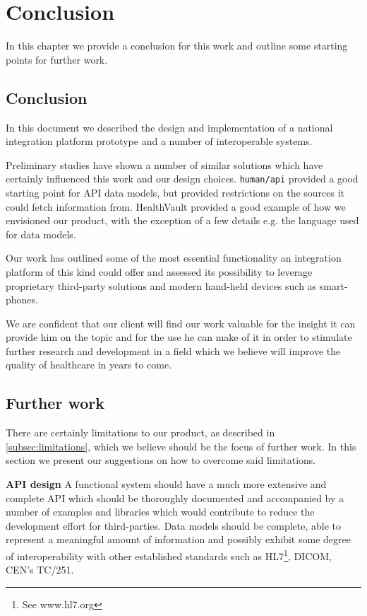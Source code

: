 \chapter{Conclusion}
\label{ch:conclusion}

In this chapter we provide a conclusion for this work and outline some
starting points for further work.

\section{Conclusion}

In this document we described the design and implementation of a national integration
platform prototype and a number of interoperable systems.

Preliminary studies have shown a number of similar solutions which have certainly influenced
this work and our design choices. \verb|human/api| provided a good starting point for API data models,
but provided restrictions on the sources it could fetch information from.
HealthVault provided a good example of how we envisioned our product, with the exception
of a few details e.g. the language used for data models.

Our work has outlined some of the most essential functionality an integration platform
of this kind could offer and assessed its possibility to leverage proprietary
third-party solutions and modern hand-held devices such as smart-phones.

We are confident that our client will find our work valuable for the insight it can provide
him on the topic and for the use he can make of it in order to stimulate further research
and development in a field which we believe will improve the quality of healthcare in years to come.

\section{Further work}

There are certainly limitations to our product, as described in \ref{subsec:limitations}, which we believe should be
the focus of further work. In this section we present our suggestions on how to overcome said limitations.

\textbf{API design}\newline
A functional system should have a much more extensive and complete API which should be
thoroughly documented and accompanied by a number of examples and libraries which
would contribute to reduce the development effort for third-parties.
Data models should be complete, able to represent a meaningful amount of information
and possibly exhibit some degree of interoperability with other established standards
such as HL7\footnote{See www.hl7.org}, DICOM, CEN's TC/251.


